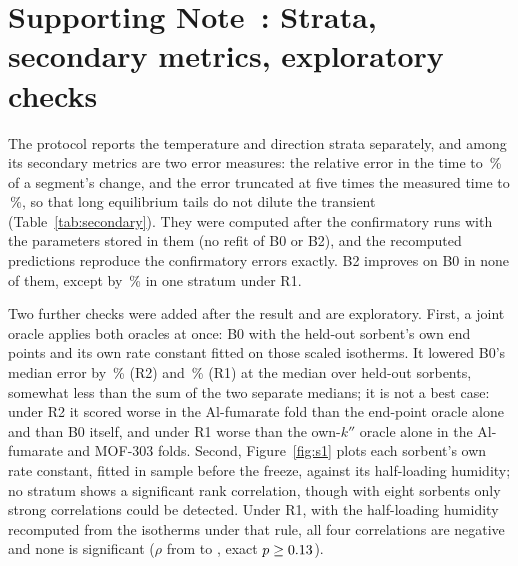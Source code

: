 \documentclass[11pt]{article}
\newcommand{\kpp}{k''}
\begin{document}
\begin{table}[h]
\centering
\small
\caption{Median held-out error over each material's own segments (parent and composite separately, unlike the pooled
fold medians of Table~ of the main text), held out alone (LOSO) or with its whole family (LOFO), for B0 and B2 under
the primary dry-mass rule.}\label{tab:h4c}

\end{table}

\section*{Supporting Note~: Strata, secondary metrics, exploratory checks}

The protocol reports the temperature and direction strata separately, and among its secondary metrics are two
error measures: the relative
error in the time to \,\% of a segment's change, and the error truncated at five times the measured
time to \,\%, so that long equilibrium tails do not dilute the transient (Table~\ref{tab:secondary}).
They were computed after the confirmatory runs with the parameters stored in them (no refit of B0 or B2), and the
recomputed predictions reproduce the confirmatory errors exactly. B2 improves on B0 in none of them, except by
\,\% in one stratum under R1.

Two further checks were added after the result and are exploratory. First, a joint oracle applies both oracles at once:
B0 with the held-out sorbent's own end points and its own rate constant fitted on those scaled isotherms. It lowered
B0's median error by \,\% (R2) and \,\% (R1) at the median over held-out sorbents,
somewhat less than the sum of the two separate medians; it is not a best case: under R2 it scored worse in the Al-fumarate fold
than the end-point oracle alone and than B0 itself, and under R1 worse than the own-$\kpp$ oracle alone in the
Al-fumarate and MOF-303 folds. Second, Figure~\ref{fig:s1} plots each sorbent's own rate constant, fitted in
sample before the freeze, against its half-loading humidity; no stratum shows a significant rank correlation, though
with eight sorbents only strong correlations could be detected. Under R1, with the half-loading humidity recomputed
from the isotherms under that rule, all four correlations are negative and none is significant ($\rho$ from
 to , exact $p \ge \V{res_rho1_p}{0.13}$).
\end{document}
